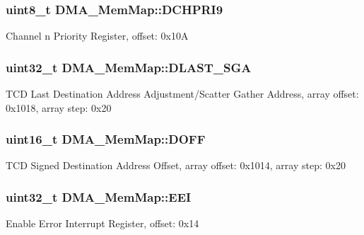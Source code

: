 \subsubsection[{D\+C\+H\+P\+R\+I9}]{\setlength{\rightskip}{0pt plus 5cm}uint8\+\_\+t D\+M\+A\+\_\+\+Mem\+Map\+::\+D\+C\+H\+P\+R\+I9}\label{struct_d_m_a___mem_map_a364959f468d1568b369d5a398ad30551}
Channel n Priority Register, offset\+: 0x10\+A \hypertarget{struct_d_m_a___mem_map_ace5b1452402cb8cd1863c10b0b8dc8bc}{}
\subsubsection[{D\+L\+A\+S\+T\+\_\+\+S\+G\+A}]{\setlength{\rightskip}{0pt plus 5cm}uint32\+\_\+t D\+M\+A\+\_\+\+Mem\+Map\+::\+D\+L\+A\+S\+T\+\_\+\+S\+G\+A}\label{struct_d_m_a___mem_map_ace5b1452402cb8cd1863c10b0b8dc8bc}
T\+C\+D Last Destination Address Adjustment/\+Scatter Gather Address, array offset\+: 0x1018, array step\+: 0x20 \hypertarget{struct_d_m_a___mem_map_a237b710c96aa2c5455df7ae2fc20f1ec}{}
\subsubsection[{D\+O\+F\+F}]{\setlength{\rightskip}{0pt plus 5cm}uint16\+\_\+t D\+M\+A\+\_\+\+Mem\+Map\+::\+D\+O\+F\+F}\label{struct_d_m_a___mem_map_a237b710c96aa2c5455df7ae2fc20f1ec}
T\+C\+D Signed Destination Address Offset, array offset\+: 0x1014, array step\+: 0x20 \hypertarget{struct_d_m_a___mem_map_af6d4e36800f891e548be42bb47e36aef}{}
\subsubsection[{E\+E\+I}]{\setlength{\rightskip}{0pt plus 5cm}uint32\+\_\+t D\+M\+A\+\_\+\+Mem\+Map\+::\+E\+E\+I}\label{struct_d_m_a___mem_map_af6d4e36800f891e548be42bb47e36aef}
Enable Error Interrupt Register, offset\+: 0x14 \hypertarget{struct_d_m_a___mem_map_a5dd80d7a64d93b113f306641b42d4365}{}
